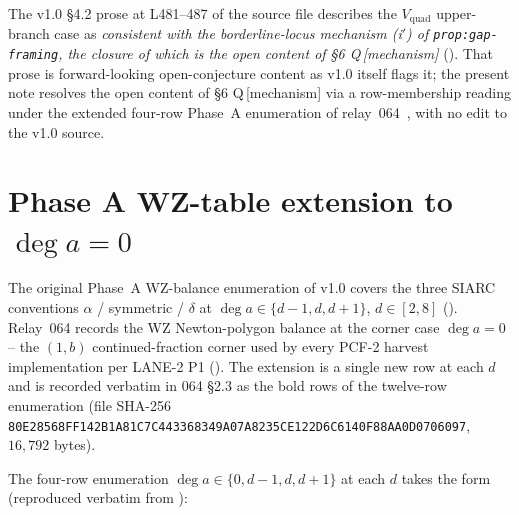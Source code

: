 \documentclass[11pt,reqno]{amsart}
\theoremstyle{plain}
\theoremstyle{definition}
\theoremstyle{remark}
\newcommand{\dega}{\deg a}
\newcommand{\Vquad}{V_{\mathrm{quad}}}
\begin{document}
The v1.0 \S 4.2 prose at L481--487 of the source file describes
the $\Vquad$ upper-branch case as \emph{consistent with the
borderline-locus mechanism \textup{(i$'$)} of
\texttt{prop:gap-framing}, the closure of which is the open
content of \S 6 Q\,[mechanism]} (\cite[L481--487]%
{bt_baseline_note_v10}). That prose is forward-looking
open-conjecture content as v1.0 itself flags it; the present
note resolves the open content of \S 6 Q\,[mechanism] via a
row-membership reading under the extended four-row Phase~A
enumeration of relay~064~\cite{phase_a_deg_a_zero_064}, with
no edit to the v1.0 source.

\section{Phase A WZ-table extension to $\dega = 0$}
\label{sec:phase-a-extension}

The original Phase~A WZ-balance enumeration of v1.0 covers the
three SIARC conventions $\alpha$ / symmetric / $\delta$ at
$\dega \in \{d-1, d, d+1\}$, $d \in [2, 8]$
(\cite[\S 2.3, \S 3.4]{bt_baseline_note_v10}). Relay~064
records the WZ Newton-polygon balance at the corner case
$\dega = 0$ -- the $(1, b)$ continued-fraction corner used by
every PCF-2 harvest implementation per LANE-2 P1
(\cite[\S 2.2, \S 4]{phase_a_deg_a_zero_064}). The extension
is a single new row at each $d$ and is recorded verbatim in
064 \S 2.3 as the bold rows of the twelve-row enumeration
(file SHA-256
\verb|80E28568FF142B1A81C7C443368349A07A8235CE122D6C6140F88AA0D0706097|,
$16{,}792$ bytes).

The four-row enumeration $\dega \in \{0, d-1, d, d+1\}$ at
each $d$ takes the form (reproduced verbatim from
\cite[\S 2.3, L102--118]{phase_a_deg_a_zero_064}):
\end{document}

